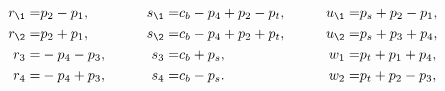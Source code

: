 \begin{equation}  
\begin{aligned} r_\1=& p_2-p_1,\\
         r_\2=& p_2+p_1, \\
         r_3=& -p_4-p_3,\\
        r_4=& -p_4+p_3,
\end{aligned}\qquad\quad
\begin{aligned} 
       s_\1=& c_b-p_4+p_2-p_t,\\
         s_\2=& c_b-p_4+p_2+p_t,\\
         s_3=& c_b+p_s,\\
        s_4=& c_b-p_s . 
\end{aligned}
\qquad\quad \begin{aligned} u_\1=& p_s+p_2-p_1,\\
         u_\2=& p_s+p_3+p_4,\\
         w_1=& p_t+p_1+p_4,\\
        w_2=& p_t+p_2-p_3 , 
\end{aligned} \end{equation}

